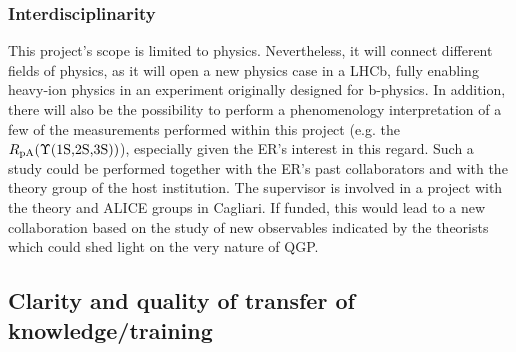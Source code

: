 \documentclass[a4paper,11pt]{article}
\newcommand{\ER}{ER\xspace}
\newcommand{\Supervisor}{The supervisor\xspace}
\begin{document}
\subsubsection{Interdisciplinarity}

This project's scope is limited to physics. Nevertheless, it will connect different fields of physics, as it will open a new physics case in a LHCb, fully enabling heavy-ion physics in an experiment originally designed for b-physics.
In addition, there will also be the possibility to perform a phenomenology interpretation of a few of the measurements performed within this project (e.g. the $R_{\text{pA}}(\Upsilon\text{(1S,2S,3S)})$), especially given the \ER's interest in this regard. Such a study could be performed together with the \ER's past collaborators and with the theory group of the host institution. \Supervisor is involved in a project with the theory and ALICE  groups in Cagliari. If funded, this would lead to a new collaboration based on the study of new observables indicated by the theorists which could shed light on the very nature of QGP.

%       

\subsection{Clarity and quality of transfer of knowledge/training}

\end{document}
